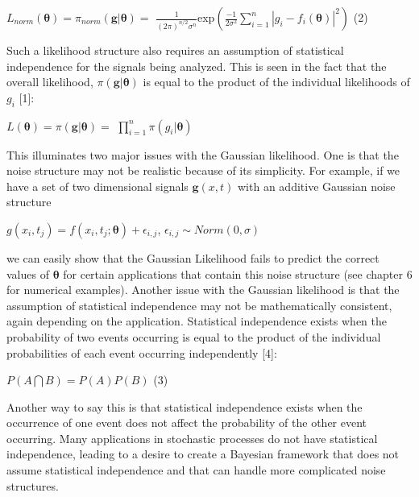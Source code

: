 \documentclass[botnum, fleqn]{unmeethesis}
\begin{document}
\hspace{\fill}	$L_{norm}(\bm{\theta})=\pi_{norm}(\bm{g}|\bm{\theta})=$ \large$\frac{1}{(2\pi)^{n/2}\sigma^n}$\normalsize exp$(\frac{-1}{2\sigma^2}\sum_{i=1}^{n}|g_i-f_i(\bm{\theta})|^2)$\hspace{\fill} \normalsize (2)

Such a likelihood structure also requires an assumption of statistical independence for the signals being analyzed. This is seen in the fact that the overall likelihood, $\pi(\bm{g}|\bm{\theta})$ is equal to the product of the individual likelihoods of $g_i$ [1]:
\begin{center}
	$L(\bm{\theta})=\pi(\bm{g}|\bm{\theta})=$ \large$\prod^n_{i=1}$$ \pi(g_i|\bm{\theta})$
\end{center}
This illuminates two major issues with the Gaussian likelihood. One is that the noise structure may not be realistic because of its simplicity. For example, if we have a set of two dimensional signals $\bm{g}(x,t)$ with an additive Gaussian noise structure
\begin{center}
	$g(x_{i},t_{j})=f(x_{i},t_{j};\bm{\theta})+\epsilon_{i,j}$,  \hspace{1cm}$\epsilon_{i,j}\sim Norm(0,\sigma)$
\end{center}
we can easily show that the Gaussian Likelihood fails to predict the correct values of $\bm{\theta}$ for certain applications that contain this noise structure (see chapter 6 for numerical examples).
Another issue with the Gaussian likelihood is that the assumption of statistical independence may not be mathematically consistent, again depending on the application. Statistical independence exists when the probability of two events occurring is equal to the product of the individual probabilities of each event occurring independently [4]:

\hspace{\fill} $P(A\bigcap B)=P(A)P(B)$\hspace{\fill} \normalsize (3)

Another way to say this is that statistical independence exists when the occurrence of one event does not affect the probability of the other event occurring. Many applications in stochastic processes do not have statistical independence, leading to a desire to create a Bayesian framework that does not assume statistical independence and that can handle more complicated noise structures. 
\end{document}
